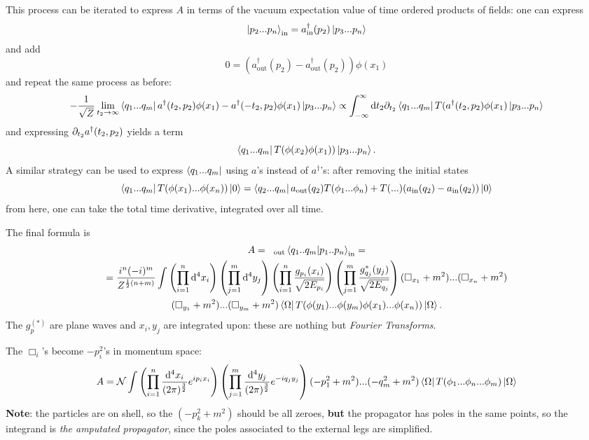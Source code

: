 This process can be iterated to express $A$ in terms of the vacuum expectation
value of time ordered products of fields: one can 
express
\[
    \ket{p_2...p_n}_\text{in} = a^\dagger_\text{in}(p_2)\ket{p_3...p_n}
\]
and add
\[
    0=\left(a^\dagger_\text{out}(p_2)-a^\dagger_\text{out}(p_2)\right)\phi(x_1)
\]
and repeat the same process as before:
\[
    -\frac{1}{\sqrt{Z}}\lim\limits_{t_2\to\infty}\bra{q_1...q_m}a^\dagger(
    t_2,p_2)\phi(x_1)-a^\dagger(-t_2,p_2)\phi(x_1)\ket{p_3...p_n}\propto
    \int_{-\infty}^{\infty} \dd t_2 \partial_{t_2}\bra{q_1...q_m}T(a^\dagger(t_2,p_2)
    \phi(x_1)\ket{p_3...p_n}
\]  
and expressing $\partial_{t_2}a^\dagger(t_2,p_2)$ yields a term
\[
    \bra{q_1...q_m}T(\phi(x_2)\phi(x_1))\ket{p_3...p_n}.
\]
A similar strategy can be used to express $\bra{q_1...q_m}$ using $a$'s instead of
$a^\dagger$'s: after removing the initial states
\[
    \bra{q_1...q_m}T(\phi(x_1)...\phi(x_n))\ket{0} = 
    \bra{q_2...q_m}a_\text{out}(q_2)T(\phi_1...\phi_n) + T(...)(a_\text{in}(q_2)-
    a_\text{in}(q_2))\ket{0}
\]
from here, one can take the total time derivative, integrated over all time.

The final formula is
\begin{gather*}
A = \phantom{x}_\text{out}\bra{q_1..q_m}\ket{p_1..p_n}_\text{in}=\\=
\frac{i^n(-i)^m}{Z^{\frac{1}{2}(n+m)}}\int \left(\prod_{i=1}^{n} \dd^4x_i
\right)\left(\prod_{j=1}^{m}\dd^4y_j\right)\left(\prod_{i=1}^{n}\frac{g_{p_i}
(x_i)}{\sqrt{2E_{p_i}}}\right)\left(\prod_{j=1}^{m}\frac{g^*_{q_j}
(y_j)}{\sqrt{2E_{q_j}}}\right)(\Box_{x_1}+m^2)...(\Box_{x_n}+m^2)\\
(\Box_{y_1}+m^2)...(\Box_{y_m}+m^2)\bra{\Omega}T(\phi(y_1)...\phi(y_m)\phi(x_1)
...\phi(x_n))\ket{\Omega}.
\end{gather*}
The $g_p^{(*)}$ are plane waves and $x_i,y_j$ are integrated upon: these are
nothing but \textit{Fourier Transforms}.

The $\Box_{i}$'s become $-p_i^2$'s in momentum space:
\[
    A = \mathcal{N}\int\left(\prod_{i=1}^{n}\frac{\dd^4x_i}{(2\pi)^{\frac{3}{2}}}
    e^{ip_ix_i}\right)\left(\prod_{j=1}^{m}\frac{\dd^4y_j}{(2\pi)^{\frac{3}{2}}}
    e^{-iq_jy_j}\right)(-p_1^2+m^2)...(-q^2_m+m^2)\bra{\Omega}T(\phi_1...\phi_n...
    \phi_m)\ket{\Omega}
\]
\textbf{Note}: the particles are on shell, so the $(-p^2_k+m^2)$ should be all
zeroes, \textbf{but} the propagator has poles in the same points, so the
integrand is \textit{the amputated propagator}, since the poles 
associated to the external legs are simplified.

